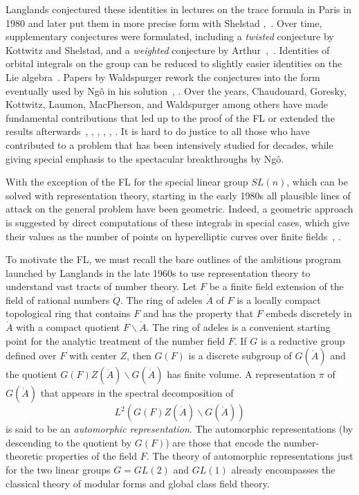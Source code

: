 Langlands conjectured these identities in lectures on the trace
formula in Paris in 1980 and later put them in more precise form with
Shelstad \cite{Langlands:debuts},~\cite{LS:1987}.  Over time,
supplementary conjectures were formulated, including a {\it twisted}
conjecture by Kottwitz and Shelstad, and a {\it weighted} conjecture
by Arthur~\cite{KS:1999},~\cite{Arthur:2002}.  Identities of orbital
integrals on the group can be reduced to slightly easier identities on
the Lie algebra~\cite{LS:1990}.  Papers by Waldspurger rework the
conjectures into the form eventually used by Ng\^o in his
solution~\cite{Wald:2008}, \cite{Wald:1991}.  Over the years,
Chaudouard, Goresky, Kottwitz, Laumon, MacPherson, and Waldspurger
among others have made fundamental contributions that led up to the
proof of the FL or extended the results afterwards~\cite{LN:08},
\cite{GKM:2004}, \cite{GKM:2006}, \cite{CL:2009:I}, \cite{CL:2009:II},
\cite{CHL:2010}.  It is hard to do justice to all those who have
contributed to a problem that has been intensively studied for
decades, while giving special emphasis to the spectacular
breakthroughs by Ng\^o.

With the exception of the FL for the special linear group $SL(n)$,
which can be solved with representation theory, starting in the early
1980s all plausible lines of attack on the general problem have been
geometric.  Indeed, a geometric approach is suggested by direct 
computations of these integrals in special cases, which
give their values as the number of points on hyperelliptic curves
over finite fields~\cite{KL:1988}, \cite{Hales:hyperelliptic}.

To motivate the FL, we must recall the bare outlines of the ambitious
program launched by Langlands in the late 1960s to use representation
theory to understand vast tracts of number theory.  Let $F$ be a
finite field extension of the field of rational numbers $\ring{Q}$.
The ring of adeles $\ring{A}$ of $F$ is a locally compact topological
ring that contains $F$ and has the property that $F$ embeds discretely
in $\ring{A}$ with a compact quotient $F\backslash\ring{A}$.  The ring
of adeles is a convenient starting point for the analytic treatment of
the number field $F$.  If $G$ is a reductive group defined over $F$
with center $Z$, then $G(F)$ is a discrete subgroup of $G(\ring{A})$
and the quotient $G(F)Z(\ring{A})\backslash G(\ring{A})$ has finite
volume.  A representation $\pi$ of $G(\ring{A})$ that appears in the
spectral decomposition of
\[
L^2(G(F)Z(\ring{A})\backslash G(\ring{A}))
\]
is said to be an {\it automorphic representation}.  The automorphic
representations (by descending to the quotient by $G(F)$) are those
that encode the number-theoretic properties of the field $F$.
The theory of automorphic representations just for the two linear
groups $G=GL(2)$ and $GL(1)$ already 
encompasses the classical theory
of modular forms and global class field theory.

